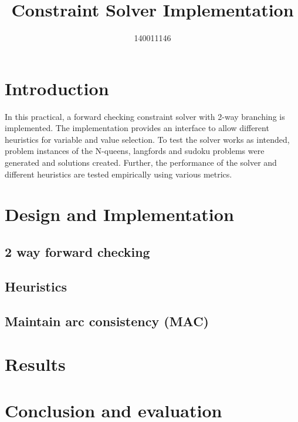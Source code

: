 \documentclass{article}
\title{Constraint Solver Implementation}
\author{140011146}
\begin{document}




\section{Introduction}
In this practical, a forward checking constraint solver with 2-way branching is implemented. The implementation provides an interface to allow different heuristics for variable and value selection. To test the solver works as intended, problem instances of the N-queens, langfords and sudoku problems were generated and solutions created. Further, the performance of the solver and different heuristics are tested empirically using various metrics.

\section{Design and Implementation}

\subsection{2 way forward checking}

\subsection{Heuristics}

\subsection{Maintain arc consistency (MAC)}

\section{Results}

\section{Conclusion and evaluation}

\end{document}
